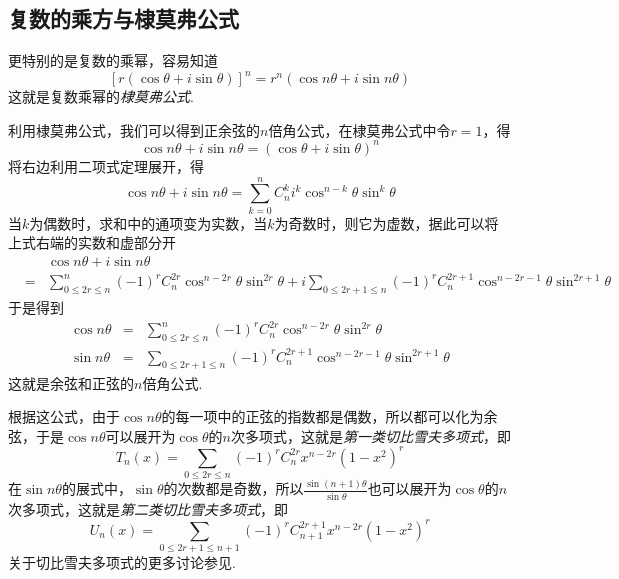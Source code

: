 \subsection{复数的乘方与棣莫弗公式}
\label{sec:demoivre-formual}


更特别的是复数的乘幂，容易知道
\begin{equation}
  \label{eq:de-moivre-formula}
  [r(\cos{\theta}+i\sin{\theta})]^n = r^n(\cos{n\theta}+i\sin{n\theta})
\end{equation}
这就是复数乘幂的\emph{棣莫弗公式}.

\begin{example}
  利用棣莫弗公式，我们可以得到正余弦的$n$倍角公式，在棣莫弗公式中令$r=1$，得
  \[ \cos{n\theta}+i\sin{n\theta} = (\cos{\theta}+i\sin{\theta})^n \]
  将右边利用二项式定理展开，得
  \[ \cos{n\theta}+i\sin{n\theta} = \sum_{k=0}^n C_n^k i^k \cos^{n-k}{\theta}\sin^k{\theta} \]
  当$k$为偶数时，求和中的通项变为实数，当$k$为奇数时，则它为虚数，据此可以将上式右端的实数和虚部分开
  \begin{eqnarray*}
   && \cos{n\theta}+i\sin{n\theta}  \\
    & = & \sum_{0 \leqslant 2r \leqslant n}^n (-1)^rC_n^{2r} \cos^{n-2r}{\theta}\sin^{2r}{\theta} + i\sum_{0 \leqslant 2r+1 \leqslant n}(-1)^rC_n^{2r+1} \cos^{n-2r-1}{\theta}\sin^{2r+1}{\theta} 
  \end{eqnarray*}
  于是得到
  \begin{eqnarray}
    \label{eq:cos-sin-of-n-theta}
    \cos{n\theta} & = & \sum_{0 \leqslant 2r \leqslant n}^n (-1)^rC_n^{2r} \cos^{n-2r}{\theta}\sin^{2r}{\theta} \\
    \sin{n\theta} & = & \sum_{0 \leqslant 2r+1 \leqslant n}(-1)^rC_n^{2r+1} \cos^{n-2r-1}{\theta}\sin^{2r+1}{\theta}
  \end{eqnarray}
  这就是余弦和正弦的$n$倍角公式.

  根据这公式，由于$\cos{n\theta}$的每一项中的正弦的指数都是偶数，所以都可以化为余弦，于是$\cos{n\theta}$可以展开为$\cos{\theta}$的$n$次多项式，这就是\emph{第一类切比雪夫多项式}，即
  \[ T_n(x) = \sum_{0 \leqslant 2r\leqslant n}(-1)^rC_n^{2r}x^{n-2r}(1-x^2)^r \]
  在$\sin{n\theta}$的展式中，$\sin{\theta}$的次数都是奇数，所以$\frac{\sin{(n+1)\theta}}{\sin{\theta}}$也可以展开为$\cos{\theta}$的$n$次多项式，这就是\emph{第二类切比雪夫多项式}，即
  \[ U_n(x)=\sum_{0 \leqslant 2r+1 \leqslant n+1}(-1)^rC_{n+1}^{2r+1}x^{n-2r}(1-x^2)^r \]
  关于切比雪夫多项式的更多讨论参见\cite{elementary-math-notes}.
\end{example}

